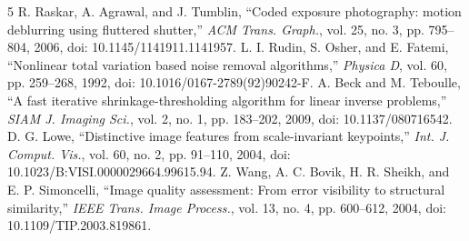 \begin{thebibliography}{5}
 R. Raskar, A. Agrawal, and J. Tumblin, ``Coded exposure photography: motion deblurring using fluttered shutter,'' \emph{ACM Trans. Graph.}, vol. 25, no. 3, pp. 795--804, 2006, doi: 10.1145/1141911.1141957.
 L. I. Rudin, S. Osher, and E. Fatemi, ``Nonlinear total variation based noise removal algorithms,'' \emph{Physica D}, vol. 60, pp. 259--268, 1992, doi: 10.1016/0167-2789(92)90242-F.
 A. Beck and M. Teboulle, ``A fast iterative shrinkage-thresholding algorithm for linear inverse problems,'' \emph{SIAM J. Imaging Sci.}, vol. 2, no. 1, pp. 183--202, 2009, doi: 10.1137/080716542.
 D. G. Lowe, ``Distinctive image features from scale-invariant keypoints,'' \emph{Int. J. Comput. Vis.}, vol. 60, no. 2, pp. 91--110, 2004, doi: 10.1023/B:VISI.0000029664.99615.94.
 Z. Wang, A. C. Bovik, H. R. Sheikh, and E. P. Simoncelli, ``Image quality assessment: From error visibility to structural similarity,'' \emph{IEEE Trans. Image Process.}, vol. 13, no. 4, pp. 600--612, 2004, doi: 10.1109/TIP.2003.819861.
\end{thebibliography}
